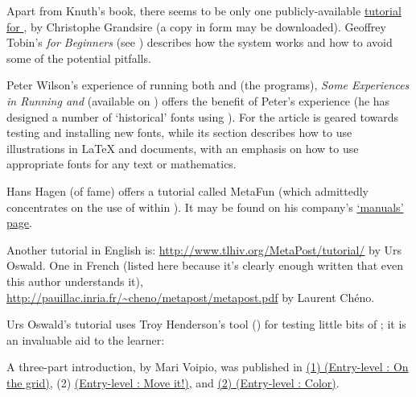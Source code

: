 
Apart from Knuth's book, there seems to be only one publicly-available
\href{http://metafont.tutorial.free.fr/}{tutorial for \MF{}}, by
Christophe Grandsire (a copy in  form may be downloaded).
Geoffrey Tobin's \textit{\MF{} for Beginners} %
(see ) describes how the \MF{}
system works and how to avoid some of the potential pitfalls.

Peter Wilson's experience of running both \MF{} and \MP{} (the
programs), \textit{Some Experiences in Running \MF{} and \MP{}}
(available on \ctan{}) offers the benefit of Peter's experience (he
has designed a 
number of `historical' fonts using \MF{}).  For \MF{} the article is
geared towards testing and installing new \MF{} fonts, while its \MP{}
section describes how to use \MP{} illustrations in \LaTeX{} and
\PDFLaTeX{} documents, with an emphasis on how to use appropriate
fonts for any text or mathematics.

Hans Hagen (of \CONTeXT{} fame) offers a \MP{} tutorial called
MetaFun (which admittedly concentrates on the use of \MP{} within
\CONTeXT{}).  It may be found on his company's %
\href{http://www.pragma-ade.com/general/manuals/metafun-p.pdf}{`manuals' page}.

Another \MP{} tutorial in English is: %
\url{http://www.tlhiv.org/MetaPost/tutorial/} by Urs Oswald.
One in French (listed here because it's clearly enough written
that even this author understands it),
\url{http://pauillac.inria.fr/~cheno/metapost/metapost.pdf}
by Laurent Ch\'eno.

Urs Oswald's tutorial uses Troy Henderson's tool
() for testing little bits of
\MP{}; it is an invaluable aid to the learner:

A three-part introduction, by Mari Voipio, was published in
\href{http://tug.org/TUGboat/intromp/tb106voipio-grid.pdf}{(1) (Entry-level \MP{}: On the grid)},
(2)
\href{http://tug.org/TUGboat/intromp/tb107voipio-moveit.pdf}{(Entry-level \MP{}: Move it!\@)}, and
\href{http://tug.org/TUGboat/intromp/tb108voipio-color.pdf}{(2) (Entry-level \MP{}: Color)}.

